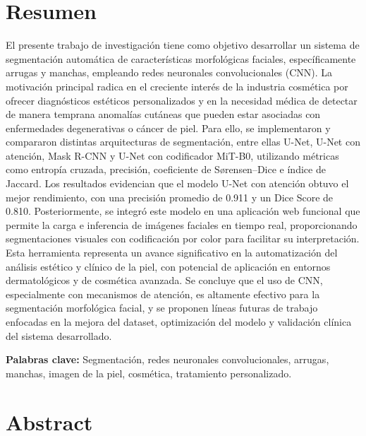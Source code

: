 \thispagestyle{plain}

\chapter*{Resumen}

El presente trabajo de investigación tiene como objetivo desarrollar un sistema de segmentación automática de características morfológicas faciales, específicamente arrugas y manchas, empleando redes neuronales convolucionales (CNN). La motivación principal radica en el creciente interés de la industria cosmética por ofrecer diagnósticos estéticos personalizados y en la necesidad médica de detectar de manera temprana anomalías cutáneas que pueden estar asociadas con enfermedades degenerativas o cáncer de piel. Para ello, se implementaron y compararon distintas arquitecturas de segmentación, entre ellas U-Net, U-Net con atención, Mask R-CNN y U-Net con codificador MiT-B0, utilizando métricas como entropía cruzada, precisión, coeficiente de Sørensen–Dice e índice de Jaccard. Los resultados evidencian que el modelo U-Net con atención obtuvo el mejor rendimiento, con una precisión promedio de 0.911 y un Dice Score de 0.810. Posteriormente, se integró este modelo en una aplicación web funcional que permite la carga e inferencia de imágenes faciales en tiempo real, proporcionando segmentaciones visuales con codificación por color para facilitar su interpretación. Esta herramienta representa un avance significativo en la automatización del análisis estético y clínico de la piel, con potencial de aplicación en entornos dermatológicos y de cosmética avanzada. Se concluye que el uso de CNN, especialmente con mecanismos de atención, es altamente efectivo para la segmentación morfológica facial, y se proponen líneas futuras de trabajo enfocadas en la mejora del dataset, optimización del modelo y validación clínica del sistema desarrollado.

\textbf{Palabras clave:} Segmentación, redes neuronales convolucionales, arrugas, manchas, imagen de la piel, cosmética, tratamiento personalizado.

\clearpage
\chapter*{Abstract}

